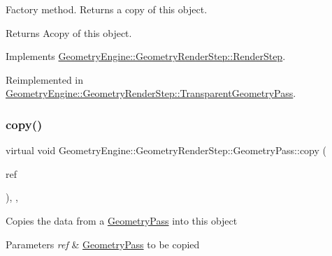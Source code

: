 Factory method. Returns a copy of this object. \begin{DoxyReturn}{Returns}
Acopy of this object. 
\end{DoxyReturn}


Implements \mbox{\hyperlink{class_geometry_engine_1_1_geometry_render_step_1_1_render_step_afe33ea9d82c5be11f55af7d39691d44b}{Geometry\+Engine\+::\+Geometry\+Render\+Step\+::\+Render\+Step}}.



Reimplemented in \mbox{\hyperlink{class_geometry_engine_1_1_geometry_render_step_1_1_transparent_geometry_pass_a6bfc83f45b84112bbf1beda1ed8e5466}{Geometry\+Engine\+::\+Geometry\+Render\+Step\+::\+Transparent\+Geometry\+Pass}}.

\mbox{\label{class_geometry_engine_1_1_geometry_render_step_1_1_geometry_pass_ae69b08dfd47ccfcc3888ca53511b660d}} 
\subsubsection{\texorpdfstring{copy()}{copy()}}
{\footnotesize\ttfamily virtual void Geometry\+Engine\+::\+Geometry\+Render\+Step\+::\+Geometry\+Pass\+::copy (\begin{DoxyParamCaption}\item[{const \mbox{\hyperlink{class_geometry_engine_1_1_geometry_render_step_1_1_geometry_pass}{Geometry\+Pass}} \&}]{ref }\end{DoxyParamCaption})\hspace{0.3cm}{\ttfamily [inline]}, {\ttfamily [protected]}, {\ttfamily [virtual]}}

Copies the data from a \mbox{\hyperlink{class_geometry_engine_1_1_geometry_render_step_1_1_geometry_pass}{Geometry\+Pass}} into this object 
\begin{DoxyParams}{Parameters}
{\em ref} & \mbox{\hyperlink{class_geometry_engine_1_1_geometry_render_step_1_1_geometry_pass}{Geometry\+Pass}} to be copied \\
\hline
\end{DoxyParams}
\mbox{\label{class_geometry_engine_1_1_geometry_render_step_1_1_geometry_pass_a0e3189d5f441ada51ef31e09f100e270}} 
